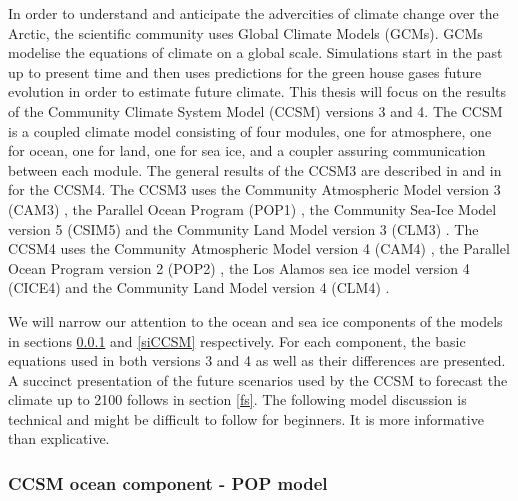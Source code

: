 In order to understand and anticipate the advercities of climate change over the Arctic, the scientific community uses Global Climate Models (GCMs). GCMs modelise the equations of climate on a global scale. Simulations start in the past up to present time and then uses predictions for the green house gases future evolution in order to estimate future climate. This thesis will focus on the results of the Community Climate System Model (CCSM) versions 3 and 4. The CCSM is a coupled climate model consisting of four modules, one for atmosphere, one for ocean, one for land, one for sea ice, and a coupler assuring communication between each module. The general results of the CCSM3 are described in \cite{Collins2006ccsm3} and in \citet{gent2011} for the CCSM4. The CCSM3 uses the Community Atmospheric Model version 3 (CAM3) \citep{cam3a,cam3b},  the Parallel Ocean Program (POP1) \citep{Smith:2004uq},  the Community Sea-Ice Model version 5 (CSIM5) \citep{Briegleb:2004kx} and the Community Land Model version 3 (CLM3) \citep{clm3a,clm3b,Bonan:2002uq}. The CCSM4 uses the Community Atmospheric Model version 4 (CAM4) \citep{Neale:2010qf}, the Parallel Ocean Program version 2 (POP2) \citep{SmithPop2010, Danabasoglu:2012zr}, the Los Alamos sea ice model version 4 (CICE4) \citep{Hunke:2008ly} and the Community Land Model version 4 (CLM4) \citep{clm4a,clm4b,Lawrence:2011ys}.

We will narrow our attention to the ocean and sea ice components of the models in sections \ref{oceanCCSM} and \ref{siCCSM} respectively. For each component, the basic equations used in both versions 3 and 4 as well as their differences are presented. A succinct presentation of the future scenarios used by the CCSM to forecast the climate up to 2100 follows in section \ref{fs}. The following model discussion is technical and might be difficult to follow for beginners. It is more informative than explicative. 

\subsubsection{CCSM ocean component - POP model}\label{oceanCCSM}

